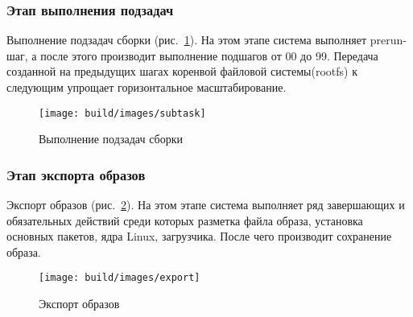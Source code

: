 \newpage
\subsubsection{Этап выполнения подзадач}
Выполнение подзадач сборки (рис.~\ref{fig: subtask}). На этом этапе система выполняет prerun-шаг, а после этого производит выполнение подшагов от 00 до 99.
Передача созданной на предыдущих шагах коренвой файловой системы(rootfs) к следующим упрощает горизонтальное масштабирование.
\begin{figure}[h!]
  \centering
  \setlength{\fboxsep}{5pt}
  \texttt{[image: build/images/subtask]}
  \caption{Выполнение подзадач сборки}\label{fig: subtask}
\end{figure}

\newpage
\subsubsection{Этап экспорта образов}
Экспорт образов (рис.~\ref{fig: export}). На этом этапе система выполняет ряд завершающих и обязательных действий среди которых разметка файла образа,
установка основных пакетов, ядра Linux, загрузчика. После чего производит сохранение образа.
\begin{figure}[h!]
  \centering
  \setlength{\fboxsep}{5pt}
  \texttt{[image: build/images/export]}
  \caption{Экспорт образов}\label{fig: export}
\end{figure}
\newpage

